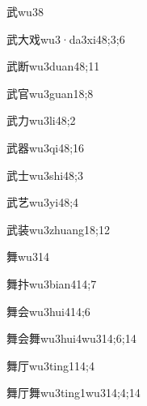\begin{verbete}{武}{wu3}{8}
\end{verbete}
\begin{verbete}{武大戏}{wu3·da3xi4}{8;3;6}
\end{verbete}
\begin{verbete}{武断}{wu3duan4}{8;11}
\end{verbete}
\begin{verbete}{武官}{wu3guan1}{8;8}
\end{verbete}
\begin{verbete}{武力}{wu3li4}{8;2}
\end{verbete}
\begin{verbete}{武器}{wu3qi4}{8;16}
\end{verbete}
\begin{verbete}{武士}{wu3shi4}{8;3}
\end{verbete}
\begin{verbete}{武艺}{wu3yi4}{8;4}
\end{verbete}
\begin{verbete}{武装}{wu3zhuang1}{8;12}
\end{verbete}
\begin{verbete}{舞}{wu3}{14}
\end{verbete}
\begin{verbete}{舞抃}{wu3bian4}{14;7}
\end{verbete}
\begin{verbete}{舞会}{wu3hui4}{14;6}
\end{verbete}
\begin{verbete}{舞会舞}{wu3hui4wu3}{14;6;14}
\end{verbete}
\begin{verbete}{舞厅}{wu3ting1}{14;4}
\end{verbete}
\begin{verbete}{舞厅舞}{wu3ting1wu3}{14;4;14}
\end{verbete}

